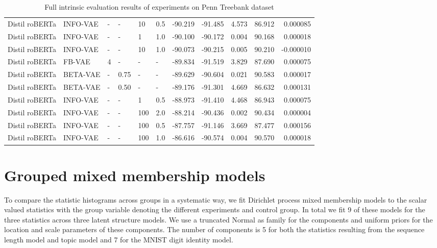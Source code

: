 \begin{table}[!htb]
\begin{tabular}{llllll|rrrrr}
 Distil roBERTa &  INFO-VAE &         - &     - &    10 &  0.5 &  -90.219 &  -91.485 &   4.573 &      86.912 &   0.000085 \\
 Distil roBERTa &  INFO-VAE &         - &     - &     1 &  1.0 &  -90.100 &  -90.172 &   0.004 &      90.168 &   0.000018 \\
 Distil roBERTa &  INFO-VAE &         - &     - &    10 &  1.0 &  -90.073 &  -90.215 &   0.005 &      90.210 &  -0.000010 \\
 Distil roBERTa &    FB-VAE &         4 &     - &     - &      - &  -89.834 &  -91.519 &   3.829 &      87.690 &   0.000075 \\
 Distil roBERTa &  BETA-VAE &         - & 0.75 &     - &      - &  -89.629 &  -90.604 &   0.021 &      90.583 &   0.000017 \\
 Distil roBERTa &  BETA-VAE &         - & 0.50 &     - &      - &  -89.176 &  -91.301 &   4.669 &      86.632 &   0.000131 \\
 Distil roBERTa &  INFO-VAE &         - &     - &     1 &  0.5 &  -88.973 &  -91.410 &   4.468 &      86.943 &   0.000075 \\
 Distil roBERTa &  INFO-VAE &         - &     - &   100 &  2.0 &  -88.214 &  -90.436 &   0.002 &      90.434 &   0.000004 \\
 Distil roBERTa &  INFO-VAE &         - &     - &   100 &  0.5 &  -87.757 &  -91.146 &   3.669 &      87.477 &   0.000156 \\
 Distil roBERTa &  INFO-VAE &         - &     - &   100 &  1.0 &  -86.616 &  -90.574 &   0.004 &      90.570 &   0.000018 \\
\bottomrule
    \end{tabular}
    \caption{Full intrinsic evaluation results of experiments on Penn Treebank dataset}
    \label{tab:ptb_full_results}
\end{table}


\section{Grouped mixed membership models}\label{app:dp-models}

To compare the statistic histograms across groups in a systematic way, we fit Dirichlet process mixed membership models to the scalar valued statistics with the group variable denoting the different experiments and control group. In total we fit 9 of these models for the three statistics across three latent structure models. We use a truncated Normal as family for the components and uniform priors for the location and scale parameters of these components. The number of components is 5 for both the statistics resulting from the sequence length model and topic model and 7 for the MNIST digit identity model.

